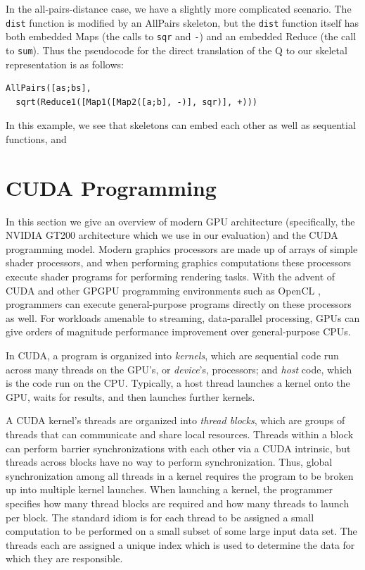 \documentclass[preprint]{sigplanconf}
\begin{document}
In the all-pairs-distance case, we have a slightly more complicated scenario.  The \texttt{dist} function is modified by an AllPairs skeleton, but the \texttt{dist} function itself has both embedded Maps (the calls to \texttt{sqr} and \texttt{-}) and an embedded Reduce (the call to \texttt{sum}).  Thus the pseudocode for the direct translation of the Q to our skeletal representation is as follows:

\begin{verbatim}
AllPairs([as;bs],
  sqrt(Reduce1([Map1([Map2([a;b], -)], sqr)], +)))
\end{verbatim}

In this example, we see that skeletons can embed each other as well as sequential functions, and 

\section{CUDA Programming}
\label{GPU}

In this section we give an overview of modern GPU architecture (specifically, the NVIDIA GT200 architecture which we use in our evaluation) and the CUDA programming model.  Modern graphics processors are made up of arrays of simple shader processors, and when performing graphics computations these processors execute shader programs for performing rendering tasks.  With the advent of CUDA and other GPGPU programming environments such as OpenCL \cite{Muns08}, programmers can execute general-purpose programs directly on these processors as well.  For workloads amenable to streaming, data-parallel processing, GPUs can give orders of magnitude performance improvement over general-purpose CPUs.

In CUDA, a program is organized into {\it kernels}, which are sequential code run across many threads on the GPU's, or {\it device}'s, processors; and {\it host} code, which is the code run on the CPU.  Typically, a host thread launches a kernel onto the GPU, waits for results, and then launches further kernels.

A CUDA kernel's threads are organized into {\it thread blocks}, which are groups of threads that can communicate and share local resources.  Threads within a block can perform barrier synchronizations with each other via a CUDA intrinsic, but threads across blocks have no way to perform synchronization.  Thus, global synchronization among all threads in a kernel requires the program to be broken up into multiple kernel launches.  When launching a kernel, the programmer specifies how many thread blocks are required and how many threads to launch per block.  The standard idiom is for each thread to be assigned a small computation to be performed on a small subset of some large input data set.  The threads each are assigned a unique index which is used to determine the data for which they are responsible.
\end{document}
